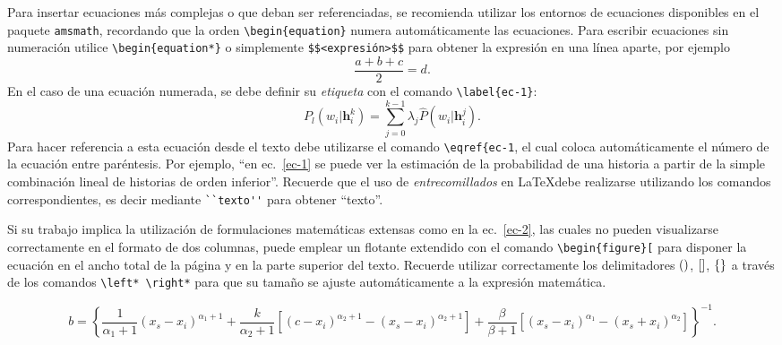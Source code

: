 \documentclass[esp]{FCEFyN-class}
\newcommand{\vect}[1]{\mathbf{#1}}  %
\begin{document}
Para insertar ecuaciones más complejas o que deban ser referenciadas, se recomienda utilizar los
entornos de ecuaciones disponibles en el paquete \verb!amsmath!, recordando que la orden 
\verb!\begin{equation}! numera automáticamente las ecuaciones. Para escribir ecuaciones sin
numeración utilice \verb!\begin{equation*}! o simplemente \verb!$$<expresión>$$! para
obtener la expresión en una línea aparte, por ejemplo $$ \frac{a + b + c}{2} = d. $$
En el caso de una ecuación numerada, se debe definir su \emph{etiqueta} con el comando
\verb!\label{ec-1}!:
\begin{equation} \label{ec-1}
 P_l(w_i|\vect{h}_i^{k}) = \sum_{j=0}^{k-1} \lambda_j \hat{P}(w_i|\vect{h}_i^{j}).
\end{equation}
Para hacer referencia a esta ecuación desde el texto debe utilizarse el comando \verb!\eqref{ec-1!,
el cual coloca automáticamente el número de la ecuación entre paréntesis. Por ejemplo, ``en
ec.~\eqref{ec-1} se puede ver la estimación de la probabilidad de una historia a partir de la simple
combinación lineal de historias de orden inferior''.
Recuerde que el uso de \emph{entrecomillados} en \LaTeX debe realizarse utilizando los comandos
correspondientes, es decir mediante \verb!``texto''! para obtener ``texto''.

Si su trabajo implica la utilización de formulaciones matemáticas extensas como en la
ec.~\eqref{ec-2}, las cuales no pueden visualizarse correctamente en el formato de dos columnas,
puede emplear un flotante extendido con el comando \verb!\begin{figure}[! para disponer la ecuación
en el ancho total de la página y en la parte superior del texto.
Recuerde utilizar correctamente los delimitadores $(\mbox)$, $[\mbox]$, $\{\mbox\}$ a través de los
comandos \verb!\left* \right*! para que su tamaño se ajuste automáticamente a la expresión matemática.
\begin{figure}[!t]
 \begin{equation}\label{ec-2}
   b = \left\{\frac{1}{\alpha_1 + 1}\left(x_s - x_i\right)^{\alpha_1+1} + \frac{k}{\alpha_2 + 1}
   \left[\left(c - x_i\right)^{\alpha_2+1} - \left(x_s - x_i\right)^{\alpha_2+1}\right]
   + \frac{\beta}{\beta + 1}\left[\left(x_s - x_i\right)^{\alpha_1} - 
   \left(x_s + x_i\right)^{\alpha_2}\right]\right\}^{-1}.
 \end{equation}
\end{figure}
\end{document}
